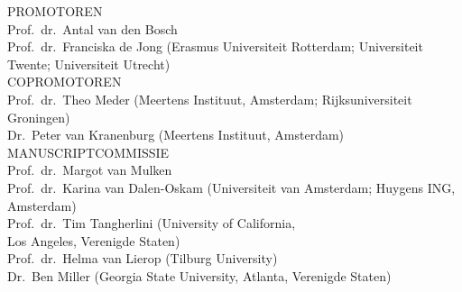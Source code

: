 
{\filcenter
  {\sffamily\lsstyle\MakeUppercase{Promotoren}}\\\vspace{0.667\baselineskip}
    Prof.\ dr.\ Antal van den Bosch\\\vspace{0.2cm}
    Prof.\ dr.\ Franciska de Jong (Erasmus Universiteit Rotterdam; Universiteit Twente; Universiteit Utrecht)\\

  \vspace{2\baselineskip}  
  {\sffamily\lsstyle\MakeUppercase{Copromotoren}}\\\vspace{0.667\baselineskip}
    Prof.\ dr.\ Theo Meder (Meertens Instituut, Amsterdam; Rijksuniversiteit Groningen)\\\vspace{0.2cm}
    Dr.\ Peter van Kranenburg (Meertens Instituut, Amsterdam)\\

  \vspace{2\baselineskip}
  {\sffamily\lsstyle\MakeUppercase{Manuscriptcommissie}}\\\vspace{0.667\baselineskip}
    Prof.\ dr.\ Margot van Mulken\\\vspace{0.2cm}
    Prof.\ dr.\ Karina van Dalen-Oskam (Universiteit van Amsterdam; Huygens ING, Amsterdam)\\\vspace{0.2cm}
    Prof.\ dr.\ Tim Tangherlini (University of California,\\Los Angeles, Verenigde Staten)\\\vspace{0.2cm}
    Prof.\ dr.\ Helma van Lierop (Tilburg University)\\\vspace{0.2cm}
    Dr.\ Ben Miller (Georgia State University, Atlanta, Verenigde Staten)\\
}
      
\thispagestyle{empty}%
\clearpage%